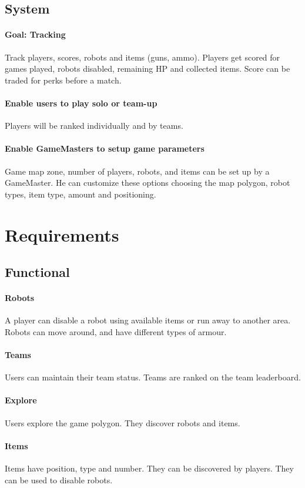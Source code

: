 \documentclass{article}
\begin{document}
\subsection{System}
\paragraph{\textbf{Goal}: Tracking}
Track players, scores, robots and items (guns, ammo). Players get scored for games played, robots disabled, remaining HP and collected items. Score can be traded for perks before a match. 
\paragraph{Enable users to play solo or team-up}
Players will be ranked individually and by teams.
\paragraph{Enable GameMasters to setup game parameters}
Game map zone, number of players, robots, and items can be set up by a GameMaster. He can customize these options choosing the map polygon, robot types, item type, amount and positioning.
\section{Requirements}
\subsection{Functional}
\paragraph{Robots}
A player can disable a robot using available items or run away to another area. Robots can move around, and have different types of armour.
\paragraph{Teams}
Users can maintain their team status. Teams are ranked on the team leaderboard.
\paragraph{Explore}
Users explore the game polygon. They discover robots and items.
\paragraph{Items}
Items have position, type and number. They can be discovered by players. They can be used to disable robots.
\end{document}
